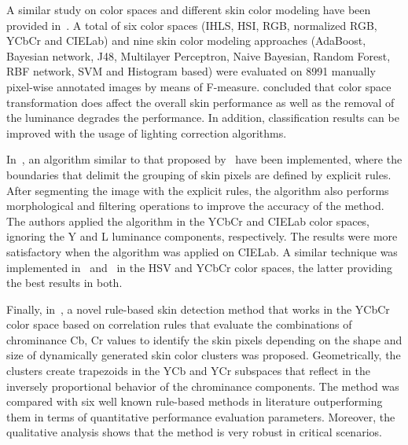 A similar study on color spaces and different skin color modeling have been provided in~\citet{khan:12}. A total of six color spaces (IHLS, HSI, RGB, normalized RGB, YCbCr and CIELab) and nine skin color modeling approaches (AdaBoost, Bayesian network, J48, Multilayer Perceptron, Naive Bayesian, Random Forest, RBF network, SVM and Histogram based) were evaluated on 8991 manually pixel-wise annotated images by means of F-measure. \citet{khan:12} concluded that color space transformation does affect the overall skin performance as well as the removal of the luminance degrades the performance. In addition, classification results can be improved with the usage of lighting correction algorithms.

In~\citet{kaur:12}, an algorithm similar to that proposed by~\citet{kovac:03} have been implemented, where the boundaries that delimit the grouping of skin pixels are defined by explicit rules. After segmenting the image with the explicit rules, the algorithm also performs morphological and filtering operations to improve the accuracy of the method. The authors applied the algorithm in the YCbCr and CIELab color spaces, ignoring the Y and L luminance components, respectively. The results were more satisfactory when the algorithm was applied on CIELab. A similar technique was implemented in~\citet{shaik:15} and~\citet{kumar:15} in the HSV and YCbCr color spaces, the latter providing the best results in both.

Finally, in~\citet{brancati:17}, a novel rule-based skin detection method that works in the YCbCr color space based on correlation rules that evaluate the combinations of chrominance Cb, Cr values to identify the skin pixels depending on the shape and size of dynamically generated skin color clusters was proposed. Geometrically, the clusters create trapezoids in the YCb and YCr subspaces that reflect in the inversely proportional behavior of the chrominance components. The method was compared with six well known rule-based methods in literature outperforming them in terms of quantitative performance evaluation parameters. Moreover, the qualitative analysis shows that the method is very robust in critical scenarios.
